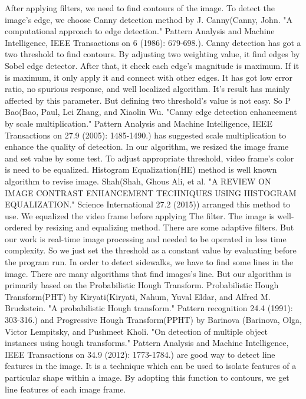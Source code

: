 After applying filters, we need to find contours of the image. To detect the image's edge, we choose Canny detection method by J. Canny(Canny, John. "A computational approach to edge detection." Pattern Analysis and Machine Intelligence, IEEE Transactions on 6 (1986): 679-698.). Canny detection has got a two threshold to find contours. By adjusting two weighting value, it find edges by Sobel edge detector. After that, it check each edge's magnitude is maximum. If it is maximum, it only apply it and connect with other edges. It has got low error ratio, no spurious response, and well localized algorithm. It's result has mainly affected by this parameter. But defining two threshold's value is not easy. So P Bao(Bao, Paul, Lei Zhang, and Xiaolin Wu. "Canny edge detection enhancement by scale multiplication." Pattern Analysis and Machine Intelligence, IEEE Transactions on 27.9 (2005): 1485-1490.) has suggested scale multiplication to enhance the quality of detection. In our algorithm, we resized the image frame and set value by some test.\newline
To adjust appropriate threshold, video frame's color is need to be equalized. Histogram Equalization(HE) method is well known algorithm to revise image. Shah(Shah, Ghous Ali, et al. "A REVIEW ON IMAGE CONTRAST ENHANCEMENT TECHNIQUES USING HISTOGRAM EQUALIZATION." Science International 27.2 (2015)) arranged this method to use. We equalized the video frame before applying The filter. The image is well-ordered by resizing and equalizing method. There are some adaptive filters. But our work is real-time image processing and needed to be operated in less time complexity. So we just set the threshold as a constant value by evaluating before the program run. \newline
In order to detect sidewalks, we have to find some lines in the image. There are many algorithms that find images's line. But our algorithm is primarily based on the Probabilistic Hough Transform. Probabilistic Hough Transform(PHT) by Kiryati(Kiryati, Nahum, Yuval Eldar, and Alfred M. Bruckstein. "A probabilistic Hough transform." Pattern recognition 24.4 (1991): 303-316.) and Progressive Hough Transform(PPHT) by Barinova (Barinova, Olga, Victor Lempitsky, and Pushmeet Kholi. "On detection of multiple object instances using hough transforms." Pattern Analysis and Machine Intelligence, IEEE Transactions on 34.9 (2012): 1773-1784.) are good way to detect line features in the image. It is a technique which can be used to isolate features of a particular shape within a image. By adopting this function to contours, we get line features of each image frame. 

